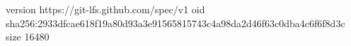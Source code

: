 version https://git-lfs.github.com/spec/v1
oid sha256:2933dfcae618f19a80d93a3e91565815743c4a98da2d46f63c0dba4c6f6f8d3c
size 16480

